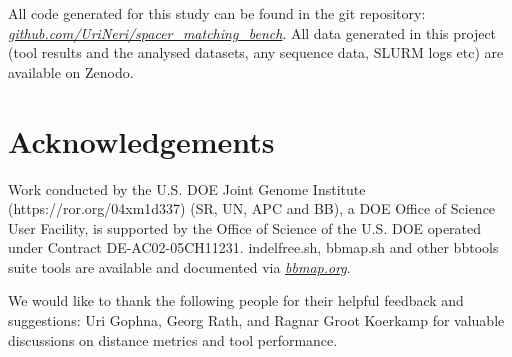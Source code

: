 \documentclass[
]{article}
\begin{document}
All code generated for this study can be found in the git repository:
\href{https://github.com/UriNeri/spacer_matching_bench}{\emph{github.com/UriNeri/spacer\_matching\_bench}}.
All data generated in this project (tool results and the analysed
datasets, any sequence data, SLURM logs etc) are available on
Zenodo\autocite{zenodo_doi}.

\section{Acknowledgements}\label{sec-acknowledgements}

Work conducted by the U.S. DOE Joint Genome Institute
(https://ror.org/04xm1d337) (SR, UN, APC and BB), a DOE Office of
Science User Facility, is supported by the Office of Science of the U.S.
DOE operated under Contract DE-AC02-05CH11231. indelfree.sh, bbmap.sh
and other bbtools suite tools are available and documented via
\href{http://bbmap.org}{\emph{bbmap.org}}.

We would like to thank the following people for their helpful feedback
and suggestions: Uri Gophna, Georg Rath, and Ragnar Groot Koerkamp for
valuable discussions on distance metrics and tool performance.


\printbibliography
\end{document}
